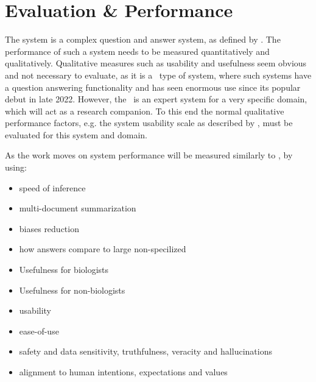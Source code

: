 \section{Evaluation \& Performance}

The system is a complex question and answer system, as defined by \cite{Daull:2023:complex}.
The performance of such a system needs to be measured quantitatively and qualitatively.
Qualitative measures such as usability and usefulness seem obvious and not necessary to evaluate, as it is a \gpts\ type of system, where such systems have a question answering functionality and has seen enormous use since its popular debut in late 2022.
However, the \project\ is an expert system for a very specific domain, which will act as a research companion.
To this end the normal qualitative performance factors, e.g. the system usability scale as described by \cite{Blattgerste:2022}, must be evaluated for this system and domain.


As the work moves on system performance will be measured similarly to \cite{Daull:2023:complex}, by using:
\begin{itemize}
    \item speed of inference
    \item multi-document summarization
    \item biases reduction
    \item how answers compare to large non-specilized \llms\
    \item Usefulness for biologists
    \item Usefulness for non-biologists
    \item usability
    \item ease-of-use
    \item safety and data sensitivity, truthfulness, veracity and hallucinations
    \item alignment to human intentions, expectations and values
\end{itemize}

